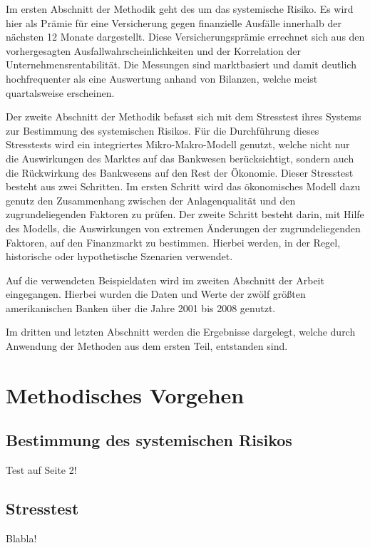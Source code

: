 \documentclass[a4paper,12pt]{scrartcl}
\begin{document}
Im ersten Abschnitt der Methodik geht des um das systemische Risiko. Es wird hier als Prämie für eine Versicherung gegen finanzielle Ausfälle innerhalb der nächsten 12 Monate dargestellt. Diese Versicherungsprämie errechnet sich aus den vorhergesagten Ausfallwahrscheinlichkeiten und der Korrelation der Unternehmensrentabilität. Die Messungen sind marktbasiert und damit deutlich hochfrequenter als eine Auswertung anhand von Bilanzen, welche meist quartalsweise erscheinen. 

Der zweite Abschnitt der Methodik befasst sich mit dem Stresstest ihres Systems zur Bestimmung des systemischen Risikos. Für die Durchführung dieses Stresstests wird ein integriertes Mikro-Makro-Modell genutzt, welche nicht nur die Auswirkungen des Marktes auf das Bankwesen berücksichtigt, sondern auch die Rückwirkung des Bankwesens auf den Rest der Ökonomie. Dieser Stresstest besteht aus zwei Schritten. Im ersten Schritt wird das ökonomisches Modell dazu genutz den Zusammenhang zwischen der Anlagenqualität und den zugrundeliegenden Faktoren zu prüfen. Der zweite Schritt besteht darin, mit Hilfe des Modells, die Auswirkungen von extremen Änderungen der zugrundeliegenden Faktoren, auf den Finanzmarkt zu bestimmen. Hierbei werden, in der Regel, historische oder hypothetische Szenarien verwendet.

Auf die verwendeten Beispieldaten wird im zweiten Abschnitt der Arbeit eingegangen. Hierbei wurden die Daten und Werte der zwölf größten amerikanischen Banken über die Jahre 2001 bis 2008 genutzt.

Im dritten und letzten Abschnitt werden die Ergebnisse dargelegt, welche durch Anwendung der Methoden aus dem ersten Teil, entstanden sind. 
\newpage

\section{Methodisches Vorgehen}
\subsection{Bestimmung des systemischen Risikos}

Test auf Seite 2!
\newpage
\subsection{Stresstest}

Blabla!
\newpage
\end{document}
